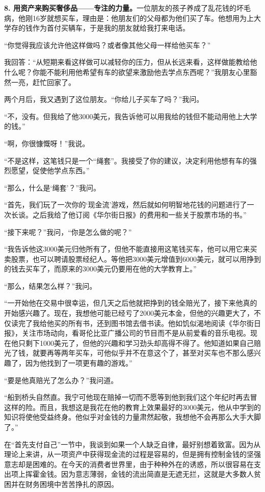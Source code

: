 \textbf{8. 用资产来购买奢侈品——专注的力量。}一位朋友的孩子养成了乱花钱的坏毛病，他刚16岁就想买车，理由是：他朋友们的父母都为他们买了车。他想用为上大学存的钱作为首付买辆车，于是我的朋友就给我打来电话。

“你觉得我应该允许他这样做吗？或者像其他父母一样给他买车？”

我回答：“从短期来看这样做可以减轻你的压力，但从长远来看，这样做能教给他什么呢？你能不能利用他希望有车的欲望来激励他去学点东西呢？”我朋友心里豁然一亮，赶忙回家了。

两个月后，我又遇到了这位朋友。“你给儿子买车了吗？”我问。

“不，没有。但我给了他3000美元，我告诉他可以用我给的钱但不能动用他上大学的钱。”

“啊，你很慷慨呀！”我说。

“不是这样，这笔钱只是一个“绳套”。我接受了你的建议，决定利用他想有车的强烈愿望，促使他学点东西。”

“那么，什么是‘绳套’？”我问。

“首先，我们玩了一次你的‘现金流’游戏，然后就如何明智地花钱的问题进行了一次长谈。之后我给了他订阅《华尔街日报》的费用和一些关于股票市场的书。”

“接下来呢？”我问，“你是怎么做的呢？”

“我告诉他这3000美元归他所有了，但他不能直接用这笔钱买车，他可以用它来买卖股票，也可以聘请股票经纪人。等他把3000美元增值到6000美元，就可以用挣到的钱去买车了，而原来的3000美元仍要用在他的大学教育上。”

“那么，结果怎么样？”我问。

“一开始他在交易中很幸运，但几天之后他就把挣到的钱全赔光了，接下来他真的开始感兴趣了。现在，我想他可能已经亏了2000美元本金，但他的兴趣更大了，不仅读完了我给他买的所有书，还到图书馆去借书读。他如饥似渴地阅读《华尔街日报》，关注市场动向，看哥伦比亚广播公司的节目而不是从前爱看的音乐电视。现在他只剩下1000美元了，但他的兴趣和学习劲头却高得不得了。他知道如果自己赔光了钱，就要再等两年买车，可他似乎并不在意这个了，甚至对买车也不那么感兴趣了，因为他找到了一项更有趣的游戏。”

“要是他真赔光了怎么办？”我问道。

“船到桥头自然直。我宁可他现在赔掉一切而不愿等到他到我们这个年纪时再去冒这样的险。而且，我想这是我花在他的教育上效果最好的3000美元，他从中学到的知识将使他受益终身。他似乎对金钱的力量肃然起敬，我想他不会再那么大手大脚了。”

在“首先支付自己”一节中，我谈到如果一个人缺乏自律，最好别想着致富。因为从理论上来讲，从一项资产中获得现金流的过程是容易的，但是拥有控制金钱的坚强意志却是困难的。在今天的消费者世界里，由于种种外在的诱惑，所以很容易在支出项上挥霍金钱。因为意志薄弱，金钱的流出简直是无遮无拦，这就是大多数人贫困并在财务困境中苦苦挣扎的原因。

